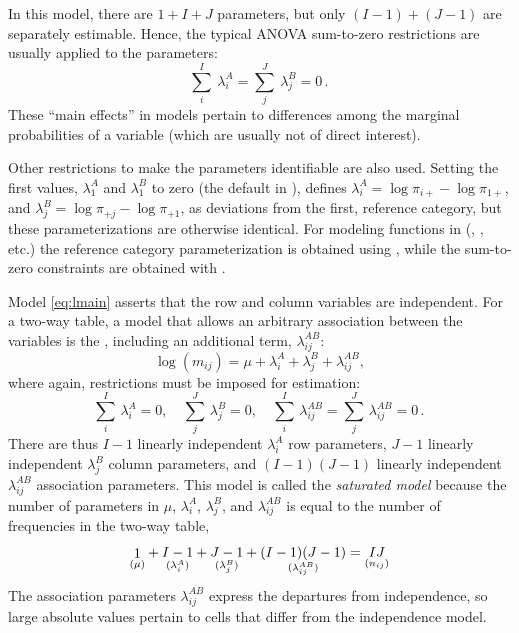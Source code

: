 \documentclass[11pt]{book}\usepackage[]{graphicx}\usepackage[]{color}
\begin{document}
In this model, there
are $1 + I + J$ parameters,  but only $(I-1)+(J-1)$ are separately
estimable. Hence,
the typical ANOVA sum-to-zero
restrictions
are usually applied to the parameters:
\begin{equation*}
\sum_i^I \:
\lambda_i^A  = \sum_j^J \:  \lambda_j^B = 0 \period
\end{equation*}
These ``main effects'' in
\loglin models pertain to differences among the marginal
probabilities of a variable (which are usually not of direct interest).

Other restrictions to make the parameters identifiable are also used.
Setting the first values,
$\lambda_1^A$ and $\lambda_1^B$
to zero (the default in ), defines
$\lambda_i^A = \log \pi_{i+} - \log \pi_{1+}$, and
$\lambda_j^B = \log \pi_{+j} - \log \pi_{+1}$,
as deviations from the first, reference category,
but these parameterizations are otherwise identical.
For modeling functions in \R (, , etc.)
the reference category parameterization is obtained using
, while the sum-to-zero constraints
are obtained with .

Model \eqref{eq:lmain} asserts that the row and column variables
are independent.
For a two-way table, a model that allows an arbitrary
association between the variables is the ,
including an additional term, $\lambda_{ij}^{AB}$:
\begin{equation}\label{eq:lsat}
\log ( m_{ij} ) = \mu  +  \lambda_i^A
+  \lambda_j^B  +  \lambda_{ij}^{AB} \comma
\end{equation}
where again, restrictions must be imposed for estimation:
\begin{equation}\label{eq:lrestrict}
\sum_i^I \,  \lambda_i^A  = 0, \quad
\sum_j^J \,  \lambda_j^B = 0, \quad
\sum_i^I \,  \lambda_{ij}^{AB} =
\sum_j^J \,  \lambda_{ij}^{AB} = 0  \period
\end{equation}
There are thus $I-1$ linearly independent $\lambda_i^A$ row parameters,
$J-1$ linearly independent $\lambda_j^B$ column parameters,
and $(I-1)(J-1)$ linearly independent $\lambda_{ij}^{AB}$ association  parameters.
This model is called the \emph{saturated model} because the number of
parameters in $\mu$, $\lambda_i^A$, $\lambda_j^B$, and $\lambda_{ij}^{AB}$
is equal to the number of frequencies in the two-way table,
\begin{equation*}
  \mathord{\mathop{1}\limits_{(\mu)}} + \mathord{\mathop{I-1}\limits_{(\lambda_i^A)}} + \mathord{\mathop{J-1}\limits_{(\lambda_j^B)}} + \mathord{\mathop{(I-1)(J-1)}\limits_{(\lambda_{ij}^{AB})}}
  = \mathord{\mathop{I J}\limits_{(n_{ij})}}
\end{equation*}
The association parameters $\lambda_{ij}^{AB}$ express the departures from independence,
so large absolute values pertain to cells that differ from the independence model.
\end{document}
